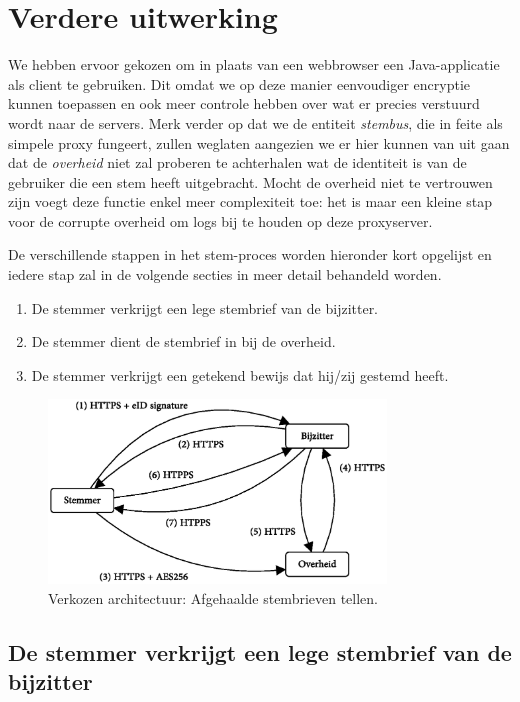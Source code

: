 \documentclass[a4paper,12pt]{article}
\begin{document}
\section{Verdere uitwerking}

We hebben ervoor gekozen om in plaats van een webbrowser een Java-applicatie als
client te gebruiken. Dit omdat we op deze manier eenvoudiger encryptie kunnen
toepassen en ook meer controle hebben over wat er precies verstuurd wordt naar
de servers. Merk verder op dat we de entiteit \emph{stembus}, die in feite als
simpele proxy fungeert, zullen weglaten aangezien we er hier kunnen van uit gaan
dat de \emph{overheid} niet zal proberen te achterhalen wat de identiteit is van
de gebruiker die een stem heeft uitgebracht. Mocht de overheid niet te
vertrouwen zijn voegt deze functie enkel meer complexiteit toe: het is maar een
kleine stap voor de corrupte overheid om logs bij te houden op deze
proxyserver.

De verschillende stappen in het stem-proces worden hieronder kort opgelijst en
iedere stap zal in de volgende secties in meer detail behandeld worden.

\begin{enumerate}
  \item De stemmer verkrijgt een lege stembrief van de bijzitter.
  \item De stemmer dient de stembrief in bij de overheid.
  \item De stemmer verkrijgt een getekend bewijs dat hij/zij gestemd heeft.
\end{enumerate}

\begin{figure}
  \centering
  \includegraphics[width=0.8\textwidth]{includes/img/schema_ontwerp.eps}
  \caption{Verkozen architectuur: Afgehaalde stembrieven tellen.}
\end{figure}

\subsection{De stemmer verkrijgt een lege stembrief van de bijzitter}
\end{document}
